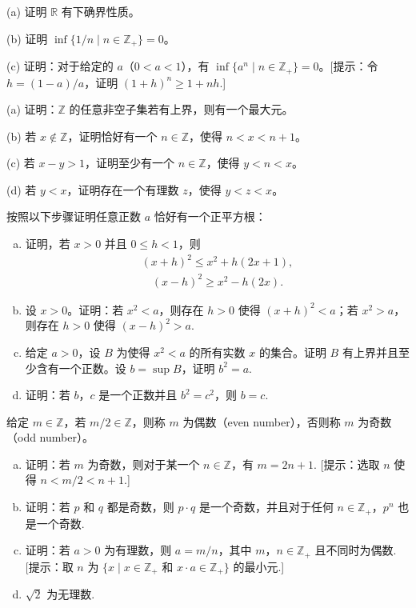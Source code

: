 \documentclass[../../main.tex]{subfiles}
\begin{document}
\begin{exercise}\label{exercise:ch01-整数与实数-8}
(a) 证明 $\mathbb{R}$ 有下确界性质。

(b) 证明 $\inf\{1/n \mid n \in \mathbb{Z}_{+}\} = 0$。

(c) 证明：对于给定的 $a$（$0 < a < 1$），有 $\inf\{a^{n} \mid n \in \mathbb{Z}_{+}\} = 0$。[提示：令 $h = (1 - a)/a$，证明 $(1 + h)^{n} \geqslant 1 + nh$.]
\end{exercise}

\begin{exercise}\label{exercise:ch01-整数与实数-9}
(a) 证明：$\mathbb{Z}$ 的任意非空子集若有上界，则有一个最大元。

(b) 若 $x \notin \mathbb{Z}$，证明恰好有一个 $n \in \mathbb{Z}$，使得 $n < x < n + 1$。

(c) 若 $x - y > 1$，证明至少有一个 $n \in \mathbb{Z}$，使得 $y < n < x$。

(d) 若 $y < x$，证明存在一个有理数 $z$，使得 $y < z < x$。
\end{exercise}

\begin{exercise}\label{exercise:ch01-整数与实数-10}
按照以下步骤证明任意正数 $a$ 恰好有一个正平方根：
\begin{enumerate}[(a)]
\item 证明，若 $x > 0$ 并且 $0 \leqslant h < 1$，则
\begin{align*}
(x + h)^{2} \leqslant x^{2} + h(2x + 1),
\end{align*}
\begin{align*}
(x - h)^{2} \geqslant x^{2} - h(2x).
\end{align*}
\item 设 $x > 0$。证明：若 $x^{2} < a$，则存在 $h > 0$ 使得 $(x + h)^{2} < a$；若 $x^{2} > a$，则存在 $h > 0$ 使得 $(x - h)^{2} > a$.
\item 给定 $a > 0$，设 $B$ 为使得 $x^{2} < a$ 的所有实数 $x$ 的集合。证明 $B$ 有上界并且至少含有一个正数。设 $b = \sup B$，证明 $b^{2} = a$.
\item 证明：若 $b$，$c$ 是一个正数并且 $b^{2} = c^{2}$，则 $b = c$.
\end{enumerate}
\end{exercise}

\begin{exercise}\label{exercise:ch01-整数与实数-11}
给定 $m \in \mathbb{Z}$，若 $m/2 \in \mathbb{Z}$，则称 $m$ 为偶数（even number），否则称 $m$ 为奇数（odd number）。
\begin{enumerate}[(a)]
\item 证明：若 $m$ 为奇数，则对于某一个 $n \in \mathbb{Z}$，有 $m = 2n + 1$. [提示：选取 $n$ 使得 $n < m/2 < n + 1$.]
\item 证明：若 $p$ 和 $q$ 都是奇数，则 $p \cdot q$ 是一个奇数，并且对于任何 $n \in \mathbb{Z}_{+}$，$p^{n}$ 也是一个奇数.
\item 证明：若 $a > 0$ 为有理数，则 $a = m/n$，其中 $m$，$n \in \mathbb{Z}_{+}$ 且不同时为偶数. [提示：取 $n$ 为 $\{x \mid x \in \mathbb{Z}_{+}$ 和 $x \cdot a \in \mathbb{Z}_{+}\}$ 的最小元.]
\item $\sqrt{2}$ 为无理数.
\end{enumerate}
\end{exercise}
\end{document}
